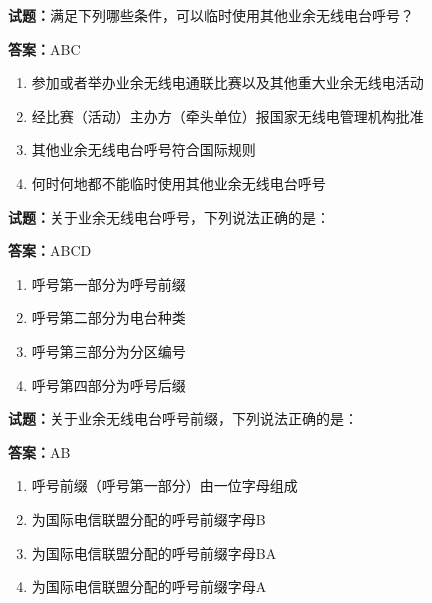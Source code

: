\documentclass{ctexbook}
\begin{document}
\vspace{1em}

\textbf{试题：}满足下列哪些条件，可以临时使用其他业余无线电台呼号？ 

\textbf{答案：}ABC 

\begin{enumerate}[leftmargin=3em]
  \item 参加或者举办业余无线电通联比赛以及其他重大业余无线电活动 

  \item 经比赛（活动）主办方（牵头单位）报国家无线电管理机构批准 

  \item 其他业余无线电台呼号符合国际规则 

  \item 何时何地都不能临时使用其他业余无线电台呼号 

\end{enumerate}





\vspace{1em}

\textbf{试题：}关于业余无线电台呼号，下列说法正确的是： 

\textbf{答案：}ABCD 

\begin{enumerate}[leftmargin=3em]
  \item 呼号第一部分为呼号前缀 

  \item 呼号第二部分为电台种类 

  \item 呼号第三部分为分区编号 

  \item 呼号第四部分为呼号后缀 

\end{enumerate}





\vspace{1em}

\textbf{试题：}关于业余无线电台呼号前缀，下列说法正确的是： 

\textbf{答案：}AB 

\begin{enumerate}[leftmargin=3em]
  \item 呼号前缀（呼号第一部分）由一位字母组成 

  \item 为国际电信联盟分配的呼号前缀字母B 

  \item 为国际电信联盟分配的呼号前缀字母BA 

  \item 为国际电信联盟分配的呼号前缀字母A 

\end{enumerate}
\end{document}
